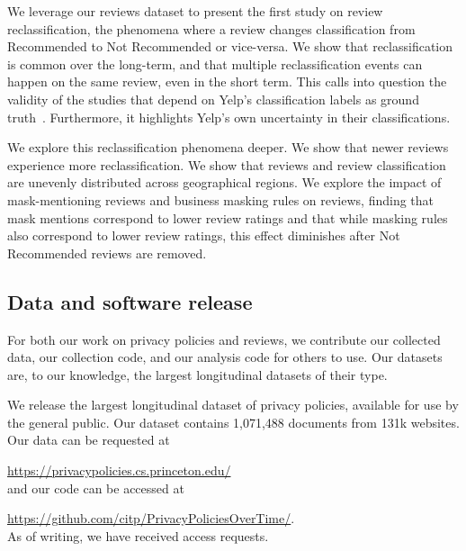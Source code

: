 We leverage our reviews dataset to present the first study on review reclassification, the phenomena where a review changes classification from Recommended to Not Recommended or vice-versa. We show that reclassification is common over the long-term, and that multiple reclassification events can happen on the same review, even in the short term. This calls into question the validity of the studies that depend on Yelp's classification labels as ground truth~\cite{rayana2015collective,kc2016temporal,mukherjee2013yelp,zhu2021ifspard,shehnepoor2017netspam,yao2017automated}. Furthermore, it highlights Yelp's own uncertainty in their classifications.

We explore this reclassification phenomena deeper. We show that newer reviews experience more reclassification. We show that reviews and review classification are unevenly distributed across geographical regions. We explore the impact of mask-mentioning reviews and business masking rules on reviews, finding that mask mentions correspond to lower review ratings and that while masking rules also correspond to lower review ratings, this effect diminishes after Not Recommended reviews are removed.

\subsection{Data and software release} \label{sec:intro:datarelease}
For both our work on privacy policies and reviews, we contribute our collected data, our collection code, and our analysis code for others to use. Our datasets are, to our knowledge, the largest longitudinal datasets of their type.

We release the largest longitudinal dataset of privacy policies, available for use by the general public. Our dataset contains 1,071,488 documents from 131k websites. Our data can be requested at \par
\url{https://privacypolicies.cs.princeton.edu/}\\
 and our code can be accessed at \par
\url{https://github.com/citp/PrivacyPoliciesOverTime/}.\\ As of writing, we have received  access requests.

